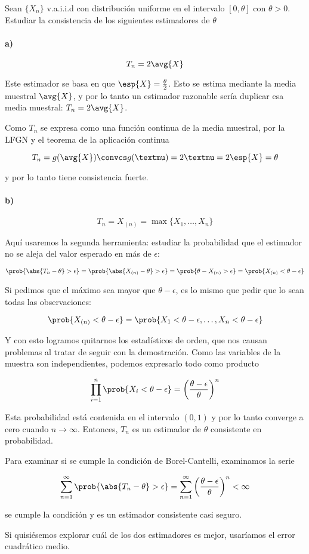 \documentclass{apuntes}
\begin{document}
\begin{example} Sean $\{X_n\}$ v.a.i.i.d con distribución uniforme en el intervalo $[0,\theta]$ con $\theta > 0$. Estudiar la consistencia de los siguientes estimadores de $\theta$

\paragraph{a)}

\[ T_n = 2\avg{X} \]

Este estimador se basa en que $\esp{X} = \frac{\theta}{2}$. Esto se estima mediante la media muestral $\avg{X}$, y por lo tanto un estimador razonable sería duplicar esa media muestral: $T_n = 2 \avg{X}$.

Como $T_n$ se expresa como una función continua de la media muestral, por la LFGN y el teorema de la aplicación continua 

\[ T_n = g(\avg{X}) \convcs g(µ) = 2µ = 2\esp{X} = \theta \]

y por lo tanto tiene consistencia fuerte.

\paragraph{b)}

\[ T_n=X_{(n)} = \max \{ X_1,\dotsc,X_n\} \]

Aquí usaremos la segunda herramienta: estudiar la probabilidad que el estimador no se aleja del valor esperado en más de $\epsilon$:

\[ \prob{\abs{T_n - \theta} > \epsilon} = \prob{\abs{X_{(n)} - \theta} > \epsilon} = \prob{\theta - X_{(n)} > \epsilon} = \prob{X_{(n)} < \theta - \epsilon} \]

Si pedimos que el máximo sea mayor que $\theta - \epsilon$, es lo mismo que pedir que lo sean todas las observaciones:

\[ \prob{X_{(n)} < \theta - \epsilon} = \prob{X_1 < \theta - \epsilon, \dotsc , X_n < \theta - \epsilon} \]

Y con esto logramos quitarnos los estadísticos de orden, que nos causan problemas al tratar de seguir con la demostración. Como las variables de la muestra son independientes, podemos expresarlo todo como producto

\[ \prod_{i=1}^n \prob{X_i < \theta - \epsilon} = \left(\frac{\theta - \epsilon}{\theta}\right)^n \]

Esta probabilidad está contenida en el intervalo $(0, 1)$ y por lo tanto converge a cero cuando $n\to \infty$. Entonces, $T_n$ es un estimador de $\theta$ consistente en probabilidad.

Para examinar si se cumple la condición de Borel-Cantelli, examinamos la serie 

\[ \sum_{n=1}^\infty \prob{\abs{T_n - \theta} > \epsilon} = \sum_{n=1}^\infty \left(\frac{\theta - \epsilon}{\theta}\right)^n < \infty \]

se cumple la condición y es un estimador consistente casi seguro.

Si quisiésemos explorar cuál de los dos estimadores es mejor, usaríamos el error cuadrático medio.

\end{example}
\end{document}
